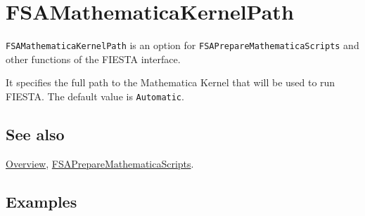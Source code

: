 \documentclass[../FeynHelpersManual.tex]{subfiles}
\begin{document}
\begin{Shaded}
\begin{Highlighting}[]
 
\end{Highlighting}
\end{Shaded}

\hypertarget{fsamathematicakernelpath}{
\section{FSAMathematicaKernelPath}\label{fsamathematicakernelpath}}

\texttt{FSAMathematicaKernelPath} is an option for
\texttt{FSAPrepareMathematicaScripts} and other functions of the FIESTA
interface.

It specifies the full path to the Mathematica Kernel that will be used
to run FIESTA. The default value is \texttt{Automatic}.

\subsection{See also}

\hyperlink{toc}{Overview},
\hyperlink{fsapreparemathematicascripts}{FSAPrepareMathematicaScripts}.

\subsection{Examples}
\end{document}
